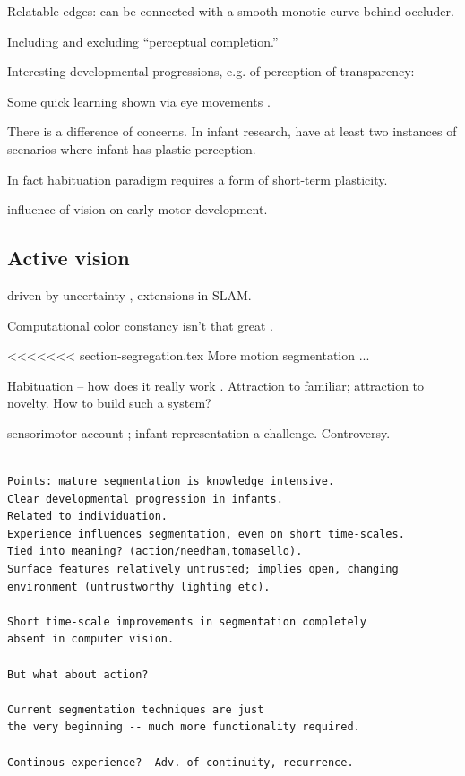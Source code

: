 Relatable edges: can be connected with a smooth monotic
curve behind occluder.

Including and excluding ``perceptual completion.''

Interesting developmental progressions, e.g. of perception
of transparency: \cite{johnson00infants}


Some quick learning shown via eye movements \cite{johnson03development}.


There is a difference of concerns.  In infant research, have
at least two instances of scenarios where infant has
plastic perception.

In fact habituation paradigm requires a form of short-term
plasticity. 


\cite{prechtl01role} influence of vision on early motor 
development.

\subsection{Active vision}

\cite{bajcsy88active,aloimonos87active,ballard91animate}

driven by uncertainty \cite{whaite97autonomous}, 
extensions in SLAM.

Computational color constancy isn't that great
\cite{barnard02comparison}.

<<<<<<< section-segregation.tex
More motion segmentation \cite{smith04layered}...

Habituation -- how does it really work \cite{sirois02models}.
Attraction to familiar; attraction to novelty.
How to build such a system?

sensorimotor account \cite{oregan01sensorimotor};
infant representation a challenge.  Controversy.



\begin{verbatim}

Points: mature segmentation is knowledge intensive.
Clear developmental progression in infants.
Related to individuation.
Experience influences segmentation, even on short time-scales.
Tied into meaning? (action/needham,tomasello).
Surface features relatively untrusted; implies open, changing 
environment (untrustworthy lighting etc).

Short time-scale improvements in segmentation completely
absent in computer vision.

But what about action?

Current segmentation techniques are just
the very beginning -- much more functionality required.

Continous experience?  Adv. of continuity, recurrence.

\end{verbatim}


